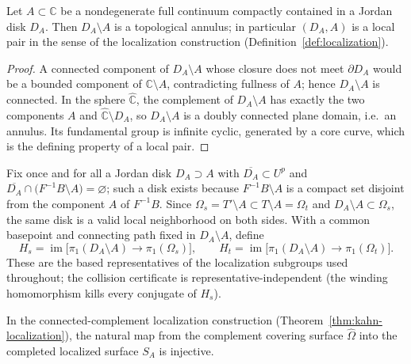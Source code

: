 
\begin{lemma}\label{lem:local-pair}
Let $A\subset\mathbb C$ be a nondegenerate full continuum compactly
contained in a Jordan disk $D_A$.  Then $D_A\setminus A$ is a
topological annulus; in particular $(D_A,A)$ is a local pair in the
sense of the localization construction
(Definition~\ref{def:localization}).
\end{lemma}

\begin{proof}
A connected component of $D_A\setminus A$ whose closure does not meet
$\partial D_A$ would be a bounded component of $\mathbb C\setminus A$,
contradicting fullness of $A$; hence $D_A\setminus A$ is connected.
In the sphere $\widehat{\mathbb C}$, the complement of $D_A\setminus A$
has exactly the two components $A$ and
$\widehat{\mathbb C}\setminus D_A$, so $D_A\setminus A$ is a doubly
connected plane domain, i.e.\ an annulus.  Its fundamental group is
infinite cyclic, generated by a core curve, which is the defining
property of a local pair.
\end{proof}

\begin{definition}\label{def:shared-neighborhood}
Fix once and for all a Jordan disk $D_A\supset A$ with
$\overline{D_A}\subset U^{p}$ and
$\overline{D_A}\cap\bigl(F^{-1}B\setminus A\bigr)=\varnothing$; such a
disk exists because $F^{-1}B\setminus A$ is a compact set disjoint from
the component $A$ of $F^{-1}B$.  Since
$\Omega_s=T'\setminus A\subset T\setminus A=\Omega_t$ and
$D_A\setminus A\subset\Omega_s$, the same disk is a valid local
neighborhood on both sides.  With a common basepoint and connecting
path fixed in $D_A\setminus A$, define
\[
 H_s=\operatorname{im}\bigl[\pi_1(D_A\setminus A)\to\pi_1(\Omega_s)\bigr],
 \qquad
 H_t=\operatorname{im}\bigl[\pi_1(D_A\setminus A)\to\pi_1(\Omega_t)\bigr].
\]
These are the based representatives of the localization subgroups used
throughout; the collision certificate is representative-independent
(the winding homomorphism kills every conjugate of $H_s$).
\end{definition}

\begin{lemma}\label{lem:completion-injective}
In the connected-complement localization construction
(Theorem~\ref{thm:kahn-localization}), the natural map from the
complement covering surface $\widehat\Omega$ into the completed
localized surface $S_A$ is injective.
\end{lemma}

